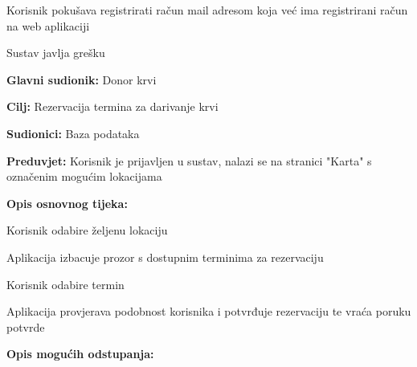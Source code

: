 \begin{packed_item}
\begin{packed_item}
\begin{packed_enum}
						\end{packed_enum}		
						\item[4.b] Korisnik pokušava registrirati račun mail adresom koja već ima registrirani račun na web aplikaciji
						\item[] \begin{packed_enum}
							
							\item Sustav javlja grešku
							
						\end{packed_enum}		
						
					\end{packed_item}
				\end{packed_item}
				
				
					\noindent {}
				\begin{packed_item}
					
					\item \textbf{Glavni sudionik: }Donor krvi
					\item  \textbf{Cilj:} Rezervacija termina za darivanje krvi
					\item  \textbf{Sudionici:} Baza podataka
					\item  \textbf{Preduvjet:} Korisnik je prijavljen u sustav, nalazi se na stranici "Karta" s označenim mogućim lokacijama
					\item  \textbf{Opis osnovnog tijeka:}
					
					\item[] \begin{packed_enum}
						
						\item Korisnik odabire željenu lokaciju
						\item Aplikacija izbacuje prozor s dostupnim terminima za rezervaciju
						\item Korisnik odabire termin
						\item Aplikacija provjerava podobnost korisnika i potvrđuje rezervaciju te vraća poruku potvrde
					\end{packed_enum}
					
					\item  \textbf{Opis mogućih odstupanja:}
					
					\item[] \begin{packed_item}
						

\end{packed_item}
\end{packed_item}
